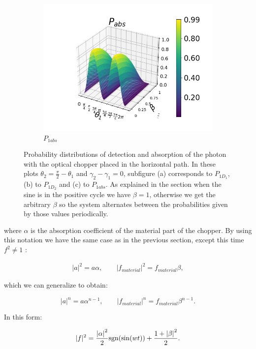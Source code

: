 \documentclass[12pt]{book}
\begin{document}
\begin{figure}[t]
\begin{subfigure}[b]{0.4\linewidth}
\includegraphics[width=\linewidth]{images/PAbs_v.png}
\caption{$P_{1abs}$}
\label{fig:BS1}
\end{subfigure}
\caption{Probability distributions of detection and absorption of the photon with the optical chopper placed in the horizontal path. In these plots $\theta_{2}=\frac{\pi}{2}-\theta_{1}$ and $\gamma_{2}-\gamma_{1}=0$, subfigure (a) corresponds to $P_{1D_{1}}$, (b) to $P_{1D_{2}}$ and (c) to $P_{1abs}$. As explained in the section when the sine is in the positive cycle we have $\beta=1$, otherwise we get the arbitrary $\beta$ so the system alternates between the probabilities given by those values periodically.}
\label{P3chopper}
\end{figure}

where $\alpha$ is the absorption coefficient of the material part of the chopper. By using this notation we have the same case as in the previous section, except this time $f^2 \neq 1$ :

\begin{align}
|a|^2=a \alpha,\qquad |f_{material}|^2=f_{material} \beta,
\end{align}

which we can generalize to obtain:

\begin{equation}
|a|^n=a\alpha^{n-1},\qquad|f_{material}|^n=f_{material} \beta^{n-1}.
\end{equation}

In this form:

\begin{equation}
|f|^2=  \frac{\abs{\alpha}^2}{2} \mathrm{sgn}(\sin(wt)) +\frac{1+\abs{\beta}^2}{2}.
\end{equation}
\end{document}

